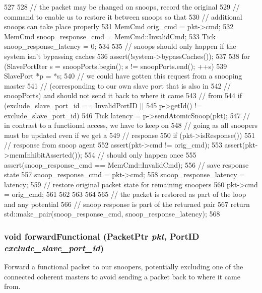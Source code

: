 \begin{DoxyCode}
527 {
528     // the packet may be changed on snoops, record the original
529     // command to enable us to restore it between snoops so that
530     // additional snoops can take place properly
531     MemCmd orig_cmd = pkt->cmd;
532     MemCmd snoop_response_cmd = MemCmd::InvalidCmd;
533     Tick snoop_response_latency = 0;
534 
535     // snoops should only happen if the system isn't bypassing caches
536     assert(!system->bypassCaches());
537 
538     for (SlavePortIter s = snoopPorts.begin(); s != snoopPorts.end(); ++s) {
539         SlavePort *p = *s;
540         // we could have gotten this request from a snooping master
541         // (corresponding to our own slave port that is also in
542         // snoopPorts) and should not send it back to where it came
543         // from
544         if (exclude_slave_port_id == InvalidPortID ||
545             p->getId() != exclude_slave_port_id) {
546             Tick latency = p->sendAtomicSnoop(pkt);
547             // in contrast to a functional access, we have to keep on
548             // going as all snoopers must be updated even if we get a
549             // response
550             if (pkt->isResponse()) {
551                 // response from snoop agent
552                 assert(pkt->cmd != orig_cmd);
553                 assert(pkt->memInhibitAsserted());
554                 // should only happen once
555                 assert(snoop_response_cmd == MemCmd::InvalidCmd);
556                 // save response state
557                 snoop_response_cmd = pkt->cmd;
558                 snoop_response_latency = latency;
559                 // restore original packet state for remaining snoopers
560                 pkt->cmd = orig_cmd;
561             }
562         }
563     }
564 
565     // the packet is restored as part of the loop and any potential
566     // snoop response is part of the returned pair
567     return std::make_pair(snoop_response_cmd, snoop_response_latency);
568 }
\end{DoxyCode}
\hypertarget{classCoherentBus_a45d5f60100921e96c8635b20cd9e9fab}{
\subsubsection[{forwardFunctional}]{\setlength{\rightskip}{0pt plus 5cm}void forwardFunctional ({\bf PacketPtr} {\em pkt}, \/  {\bf PortID} {\em exclude\_\-slave\_\-port\_\-id})}}
\label{classCoherentBus_a45d5f60100921e96c8635b20cd9e9fab}
Forward a functional packet to our snoopers, potentially excluding one of the connected coherent masters to avoid sending a packet back to where it came from.


